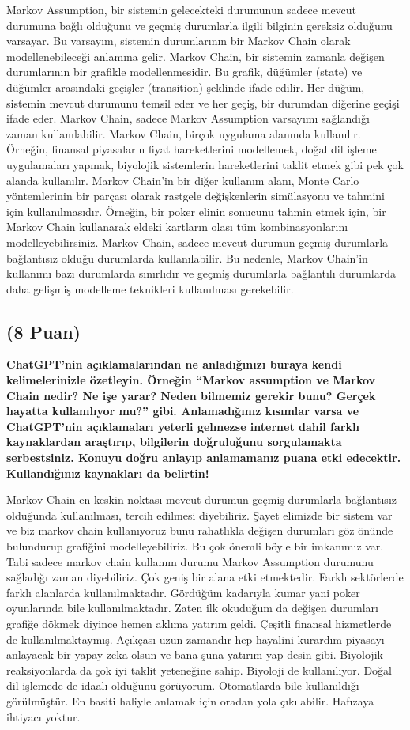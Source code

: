 \documentclass[11pt]{article}
\begin{document}
Markov Assumption, bir sistemin gelecekteki durumunun sadece mevcut durumuna bağlı olduğunu ve geçmiş durumlarla ilgili bilginin gereksiz olduğunu varsayar. Bu varsayım, sistemin durumlarının bir Markov Chain olarak modellenebileceği anlamına gelir.
Markov Chain, bir sistemin zamanla değişen durumlarının bir grafikle modellenmesidir. Bu grafik, düğümler (state) ve düğümler arasındaki geçişler (transition) şeklinde ifade edilir. Her düğüm, sistemin mevcut durumunu temsil eder ve her geçiş, bir durumdan diğerine geçişi ifade eder. Markov Chain, sadece Markov Assumption varsayımı sağlandığı zaman kullanılabilir.
Markov Chain, birçok uygulama alanında kullanılır. Örneğin, finansal piyasaların fiyat hareketlerini modellemek, doğal dil işleme uygulamaları yapmak, biyolojik sistemlerin hareketlerini taklit etmek gibi pek çok alanda kullanılır.
Markov Chain'in bir diğer kullanım alanı, Monte Carlo yöntemlerinin bir parçası olarak rastgele değişkenlerin simülasyonu ve tahmini için kullanılmasıdır. Örneğin, bir poker elinin sonucunu tahmin etmek için, bir Markov Chain kullanarak eldeki kartların olası tüm kombinasyonlarını modelleyebilirsiniz.
Markov Chain, sadece mevcut durumun geçmiş durumlarla bağlantısız olduğu durumlarda kullanılabilir. Bu nedenle, Markov Chain'in kullanımı bazı durumlarda sınırlıdır ve geçmiş durumlarla bağlantılı durumlarda daha gelişmiş modelleme teknikleri kullanılması gerekebilir.

\subsection{(8 Puan)} \textbf{ChatGPT’nin açıklamalarından ne anladığınızı buraya kendi kelimelerinizle özetleyin. Örneğin ``Markov assumption ve Markov Chain nedir? Ne işe yarar? Neden bilmemiz gerekir bunu? Gerçek hayatta kullanılıyor mu?'' gibi. Anlamadığınız kısımlar varsa ve ChatGPT’nin açıklamaları yeterli gelmezse internet dahil farklı kaynaklardan araştırıp, bilgilerin doğruluğunu sorgulamakta serbestsiniz. Konuyu doğru anlayıp anlamamanız puana etki edecektir. Kullandığınız kaynakları da belirtin!}

Markov Chain en keskin noktası mevcut durumun geçmiş durumlarla bağlantısız olduğunda kullanılması, tercih edilmesi diyebiliriz. Şayet elimizde bir sistem var ve biz markov chain kullanıyoruz bunu rahatlıkla değişen durumları göz önünde bulundurup grafiğini modelleyebiliriz. Bu çok önemli böyle bir imkanımız var. Tabi sadece markov chain kullanım durumu Markov Assumption durumunu sağladığı zaman diyebiliriz.
Çok geniş bir alana etki etmektedir. Farklı sektörlerde farklı alanlarda kullanılmaktadır. Gördüğüm kadarıyla kumar yani poker oyunlarında bile kullanılmaktadır. Zaten ilk okuduğum da değişen durumları grafiğe dökmek diyince hemen aklıma yatırım geldi. Çeşitli finansal hizmetlerde de kullanılmaktaymış. Açıkçası uzun zamandır hep hayalini kurardım piyasayı anlayacak bir yapay zeka olsun ve bana şuna yatırım yap desin gibi. Biyolojik reaksiyonlarda da çok iyi taklit yeteneğine sahip. Biyoloji de kullanılıyor. Doğal dil işlemede de idaalı olduğunu görüyorum. Otomatlarda bile kullanıldığı görülmüştür. En basiti haliyle anlamak için oradan yola çıkılabilir. Hafızaya ihtiyacı yoktur.
\end{document}
